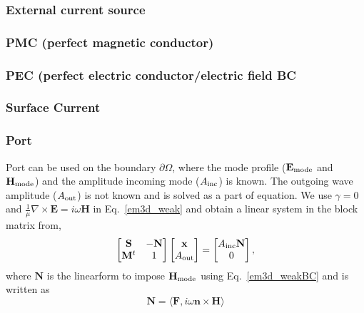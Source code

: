 \documentclass[11pt,a4paper,final]{report}
\begin{document}
 \subsubsection{External current source}
 
 \subsubsection{PMC (perfect magnetic conductor)}
 
 \subsubsection{PEC (perfect electric conductor/electric field BC}
 
  \subsubsection{Surface Current}
  
 \subsubsection{Port}
 Port can be used  on the boundary $\partial\Omega$, where the mode profile ($\mathbf{E}_{\rm mode}$ and $\mathbf{H}_{\rm mode}$) and the amplitude incoming mode ($A_{\rm inc}$) is known. The outgoing wave amplitude ($A_{\rm out}$) is not known and is solved as a part of equation. We use $\gamma=0$ and $\frac{1}{\mu}\nabla\times\mathbf{E}=i \omega \mathbf{H}$ in Eq.~\ref{em3d_weak} and obtain a linear system in the block matrix from,
\begin{equation}
\label{port_BC_blockmatrix}
 \begin{bmatrix}
 \mathbf{S}   & -\mathbf{N} \\
\mathbf{M}^t & 1\\
\end{bmatrix}
 \begin{bmatrix}
 \mathbf{x} \\
A_{\rm out}\\
\end{bmatrix}
=
 \begin{bmatrix}
A_{\rm inc} \mathbf{N}     \\
0 \\
\end{bmatrix},
 \end{equation}
where $\mathbf{N}$ is the linearform to impose  $\mathbf{H}_{\rm mode}$ using Eq.~\ref{em3d_weakBC} and is written as
\begin{equation}
\mathbf{N} = \langle \mathbf{F}, i \omega \mathbf{n} \times \mathbf{H}\rangle 
 \end{equation}
 
\end{document}
